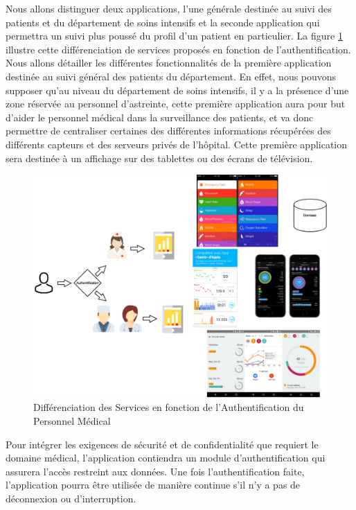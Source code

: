 Nous allons distinguer deux applications, l’une générale destinée au suivi des patients et du département de soins intensifs et la seconde application qui permettra un suivi plus poussé du profil d’un patient en particulier. La figure \ref{appli} illustre cette différenciation de services proposés en fonction de l'authentification. Nous allons détailler les différentes fonctionnalités de la première application destinée au suivi général des patients du département. En effet, nous pouvons supposer qu’au niveau du département de soins intensifs, il y a la présence d’une zone réservée au personnel d’astreinte, cette première application aura pour but d’aider le personnel médical dans la surveillance des patients, et va donc permettre de centraliser certaines des différentes informations récupérées des différents capteurs et des serveurs privés de l’hôpital. Cette première application sera destinée à un affichage sur des tablettes ou des écrans de télévision. 
\\
\begin{figure}[h!]
	\hspace*{-2.5cm}
	\centering
	\includegraphics[width=1.4\textwidth]{Application.png}
	\caption{Différenciation des Services en fonction de l'Authentification du Personnel Médical}
	\label{appli}
\end{figure}

Pour intégrer les exigences de sécurité et de confidentialité que requiert le domaine médical, l’application contiendra un module
d’authentification qui assurera l’accès restreint aux données. Une fois l’authentification faite, l’application pourra être
utilisée de manière continue s’il n’y a pas de déconnexion ou d’interruption.


